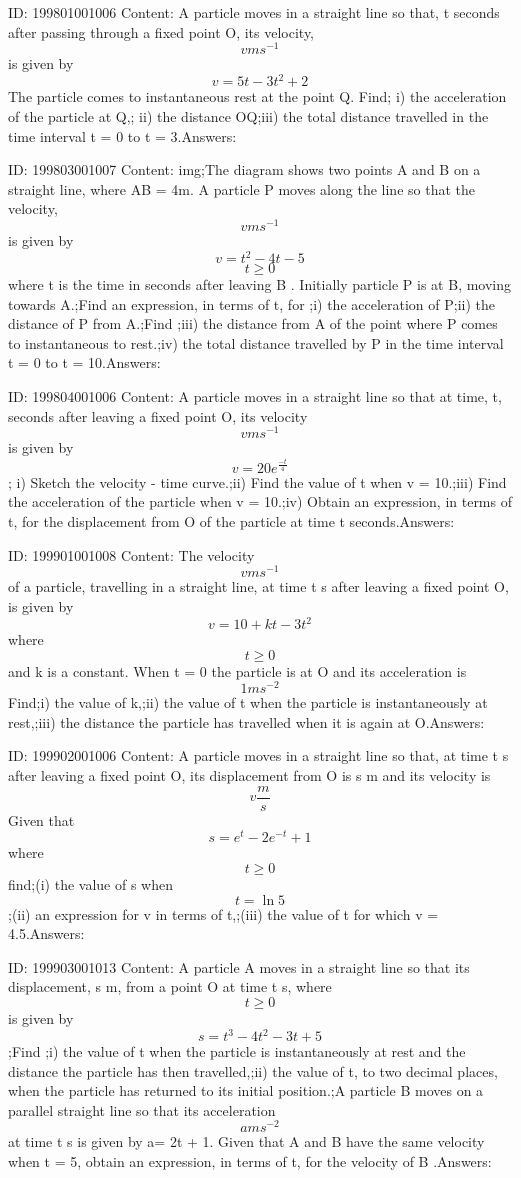 \documentclass{article}
\begin{document}
ID: 199801001006
Content:
A particle moves in a straight line so that, t seconds after passing through a fixed point O, its velocity, \[vms^{-1}\] is given by \[v=5t-3t^2+2\] The particle comes to instantaneous rest at the point Q. Find; i) the acceleration of the particle at Q,; ii) the distance OQ;iii) the total distance travelled in the time interval t = 0 to t = 3.Answers:

ID: 199803001007
Content:
img;The diagram shows two points A and B on a straight line, where AB = 4m. A particle P moves along the line so that the velocity, \[vms^{-1}\] is given by \[v=t^2-4t-5 \] \[t\geq 0\] where t is the time in seconds after leaving B . Initially particle P is at B, moving towards A.;Find an expression, in terms of t, for ;i) the acceleration of P;ii) the distance of P from A.;Find ;iii) the distance from A of the point where P comes to instantaneous to rest.;iv) the total distance travelled by P in the time interval t = 0 to t = 10.Answers:

ID: 199804001006
Content:
A particle moves in a straight line so that at time, t, seconds after leaving a fixed point O, its velocity \[vms^{-1}\] is given by \[v=20e^{\frac{-t}{4}}\]; i) Sketch the velocity - time curve.;ii) Find the value of t when v = 10.;iii) Find the acceleration of the particle when v = 10.;iv) Obtain an expression, in terms of t, for the displacement from O of the particle at time t seconds.Answers:

ID: 199901001008
Content:
The velocity \[vms^{-1}\] of a particle, travelling in a straight line, at time t s after leaving a fixed point O, is given by \[v=10+kt-3t^2\] where \[t\geq 0\] and k is a constant. When t = 0 the particle is at O and its acceleration is \[1 ms^{-2}\] Find;i) the value of k,;ii) the value of t when the particle is instantaneously at rest,;iii) the distance the particle has travelled when it is again at O.Answers:

ID: 199902001006
Content:
A particle moves in a straight line so that, at time t s after leaving a fixed point O, its displacement from O is s m and its velocity is \[v\frac{m}{s}\] Given that \[s=e^t-2e^{-t}+1\]  where \[t\geq 0\] find;(i)	the value of s when \[t = \ln 5\];(ii)	an expression for v in terms of t,;(iii)	the value of t for which v  = 4.5.Answers:

ID: 199903001013
Content:
A particle A moves in a straight line so that its displacement, s m, from a point O at time t s, where \[t\geq 0\] is given by \[s=t^3-4t^2-3t+5\];Find ;i) the value of t when the particle is instantaneously at rest and the distance the particle has then travelled,;ii) the value of t, to two decimal places, when the particle has returned to its initial position.;A particle B moves on a parallel straight line so that its acceleration \[a ms^{-2}\] at time t s is given by a= 2t + 1. Given that A and B have the same velocity when t = 5, obtain an expression, in terms of t, for the velocity of B .Answers:
\end{document}
